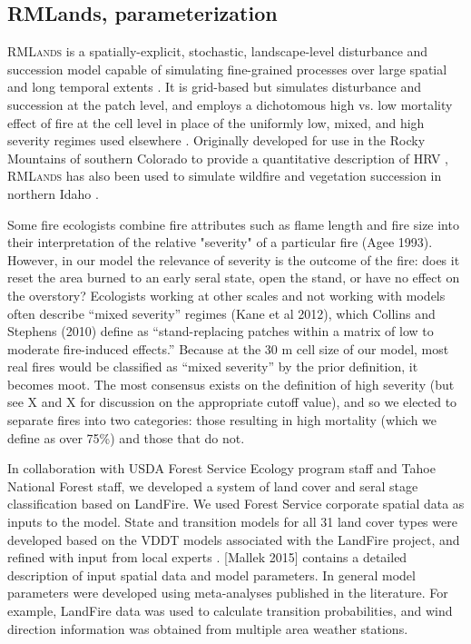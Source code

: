 \documentclass[12pt]{article}
\begin{document}
\begin{spacing}{1}
\subsection*{RMLands, parameterization}

\textsc{RMLands} is a spatially-explicit, stochastic, landscape-level disturbance and succession model capable of simulating fine-grained processes over large spatial and long temporal extents \citep{McGarigal2005}. It is grid-based but simulates disturbance and succession at the patch level, and employs a dichotomous high vs. low mortality effect of fire at the cell level in place of the uniformly low, mixed, and high severity regimes used elsewhere \citep{McGarigal2012}. Originally developed for use in the Rocky Mountains of southern Colorado to provide a quantitative description of HRV \citep{McGarigal2012}, \textsc{RMLands} has also been used to simulate wildfire and vegetation succession in northern Idaho \citep{Cushman2011}. 

Some fire ecologists combine fire attributes such as flame length and fire size into their interpretation of the relative "severity" of a particular fire (Agee 1993). However, in our model the relevance of severity is the outcome of the fire: does it reset the area burned to an early seral state, open the stand, or have no effect on the overstory?  Ecologists working at other scales and not working with models often describe ``mixed severity'' regimes (Kane et al 2012), which Collins and Stephens (2010) define as ``stand-replacing patches within a matrix of low to moderate fire-induced effects.'' Because at the 30 m cell size of our model, most real fires would be classified as ``mixed severity'' by the prior definition, it becomes moot. The most consensus exists on the definition of high severity (but see X and X for discussion on the appropriate cutoff value), and so we elected to separate fires into two categories: those resulting in high mortality (which we define as over 75\%) and those that do not.

In collaboration with USDA Forest Service Ecology program staff and Tahoe National Forest staff, we developed a system of land cover and seral stage classification based on LandFire. We used Forest Service corporate spatial data as inputs to the model. State and transition models for all 31 land cover types were developed based on the VDDT models associated with the LandFire project, and refined with input from local experts . [Mallek 2015] contains a detailed description of input spatial data and model parameters. In general model parameters were developed using meta-analyses published in the literature. For example, LandFire data was used to calculate transition probabilities, and wind direction information was obtained from multiple area weather stations.


\end{spacing}
\end{document}
